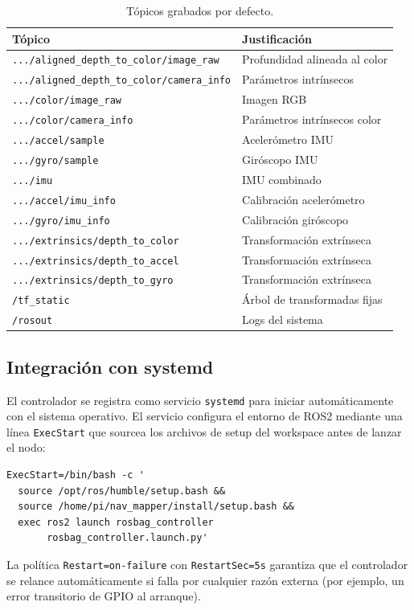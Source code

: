 \begin{table}[H]
\centering
\begin{tabular}{ll}
\toprule
\textbf{Tópico} & \textbf{Justificación} \\
\midrule
\texttt{.../aligned\_depth\_to\_color/image\_raw}  & Profundidad alineada al color \\
\texttt{.../aligned\_depth\_to\_color/camera\_info}& Parámetros intrínsecos \\
\texttt{.../color/image\_raw}                      & Imagen RGB \\
\texttt{.../color/camera\_info}                    & Parámetros intrínsecos color \\
\texttt{.../accel/sample}                          & Acelerómetro IMU \\
\texttt{.../gyro/sample}                           & Giróscopo IMU \\
\texttt{.../imu}                                   & IMU combinado \\
\texttt{.../accel/imu\_info}                       & Calibración acelerómetro \\
\texttt{.../gyro/imu\_info}                        & Calibración giróscopo \\
\texttt{.../extrinsics/depth\_to\_color}           & Transformación extrínseca \\
\texttt{.../extrinsics/depth\_to\_accel}           & Transformación extrínseca \\
\texttt{.../extrinsics/depth\_to\_gyro}            & Transformación extrínseca \\
\texttt{/tf\_static}                               & Árbol de transformadas fijas \\
\texttt{/rosout}                                   & Logs del sistema \\
\bottomrule
\end{tabular}
\caption{Tópicos grabados por defecto.}
\label{tab:rosbag-topics}
\end{table}

\subsection{Integración con systemd}
\label{sec:gpio-systemd}

El controlador se registra como servicio \texttt{systemd} para iniciar
automáticamente con el sistema operativo. El servicio configura el entorno
de ROS2 mediante una línea \texttt{ExecStart} que sourcea los archivos de
setup del workspace antes de lanzar el nodo:

\begin{verbatim}
ExecStart=/bin/bash -c '
  source /opt/ros/humble/setup.bash &&
  source /home/pi/nav_mapper/install/setup.bash &&
  exec ros2 launch rosbag_controller
       rosbag_controller.launch.py'
\end{verbatim}

La política \texttt{Restart=on-failure} con \texttt{RestartSec=5s}
garantiza que el controlador se relance automáticamente si falla por
cualquier razón externa (por ejemplo, un error transitorio de GPIO al
arranque).
